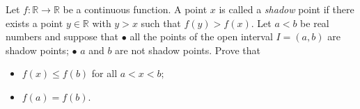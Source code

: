 Let \(f\colon \mathbb{R} \to \mathbb{R}\) be a continuous function. A point \(x\) is called a \textit{shadow} point if there exists a point \(y\in \mathbb{R}\) with \(y>x\) such that \(f(y)>f(x).\) Let \(a<b\) be real numbers and suppose that
\(\bullet\) all the points of the open interval \(I=(a,b)\) are shadow points;
\(\bullet\) \(a\) and \(b\) are not shadow points.
Prove that\begin{itemize}

\item[(a)] \(f(x)\leq f(b)\) for all \(a<x<b;\)
\item[(b)] \(f(a)=f(b).\)
\end{itemize}
